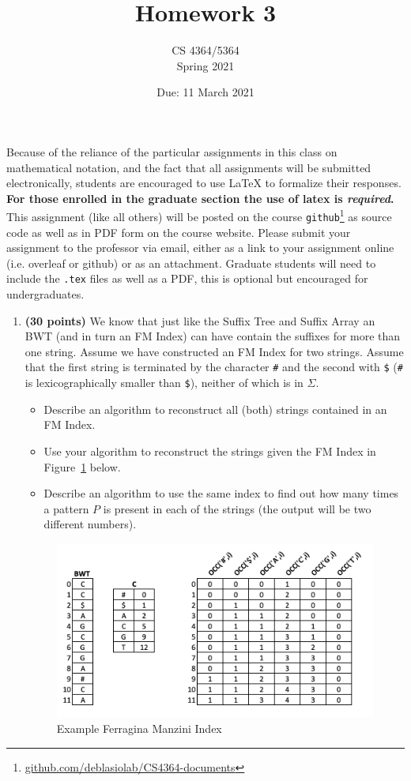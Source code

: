 \documentclass[11pt, oneside]{article}   	%
\title{Homework 3}
\author{CS 4364/5364\\Spring 2021}
\date{Due: 11 March 2021}							%
\begin{document}
\maketitle

Because of the reliance of the particular assignments in this class on mathematical notation, 
and the fact that all assignments will be submitted electronically, 
students are encouraged to use \LaTeX{} to formalize their responses. 
\textbf{For those enrolled in the graduate section the use of latex is \emph{required}.}
This assignment (like all others) will be posted on the course \texttt{github}\footnote{\url{github.com/deblasiolab/CS4364-documents}} as source code as well as in PDF form on the course website. 
Please submit your assignment to the professor via email, either as a link to your assignment online (i.e. overleaf or github) or as an attachment. 
Graduate students will need to include the \texttt{.tex} files as well as a PDF, this is optional but encouraged for undergraduates. 


\begin{enumerate}


\item \textbf{(30 points)} 
We know that just like the Suffix Tree and Suffix Array an BWT (and in turn an FM Index) can have contain the suffixes for more than one string. 
Assume we have constructed an FM Index for two strings. 
Assume that the first string is terminated by the character  \texttt{\#} and the second with \texttt{\$} (\texttt{\#} is lexicographically smaller than \texttt{\$}), neither of which is in $\Sigma$.
\begin{itemize}
\item Describe an algorithm to reconstruct all (both) strings contained in an FM Index. 
\item Use your algorithm to reconstruct the strings given the FM Index in Figure~\ref{fig:q1b} below. 
\item Describe an algorithm to use the same index to find out how many times a pattern $P$ is present in each of the strings (the output will be two different numbers). 
\end{itemize}

\begin{figure}
\includegraphics{HW3_FIG}
\caption{Example Ferragina Manzini Index}
\label{fig:q1b}
\end{figure}
\end{enumerate}
\end{document}
